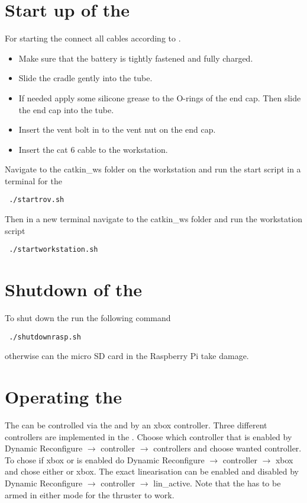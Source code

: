 \section{Start up of the \abbrROV}
For starting the \abbrROV connect all cables according to .
\begin{itemize}
	\item Make sure that the battery is tightly fastened and fully charged. 
	\item Slide the cradle gently into the \abbrROV tube. 
	\item If needed apply some silicone grease to the O-rings of the end cap. Then slide the end cap into the \abbrROV tube.
	\item Insert the vent bolt in to the vent nut on the end cap.
	\item Insert the cat 6 cable to the workstation.
 \end{itemize} 
Navigate to the catkin\_ws folder on the workstation and run the start script in a terminal for the \abbrROV
\begin{lstlisting}
 ./startrov.sh
\end{lstlisting}
Then in a new terminal navigate to the catkin\_ws folder and run the workstation script
\begin{lstlisting}
 ./startworkstation.sh
\end{lstlisting} 

\section{Shutdown of the \abbrROV}
To shut down the \abbrROV run the following command
\begin{lstlisting}
 ./shutdownrasp.sh
\end{lstlisting}
otherwise can the micro SD card in the Raspberry Pi take damage.
\section{Operating the \abbrROV}
The \abbrROV can be controlled via the \abbrGUI and by an xbox controller. Three different controllers are implemented in the \abbrROV.
Choose which controller that is enabled by Dynamic Reconfigure $\rightarrow$ controller $\rightarrow$ controllers and choose wanted controller. To chose if xbox or \abbrGUI is enabled do  Dynamic Reconfigure $\rightarrow$ controller $\rightarrow$ xbox and chose either \abbrGUI or xbox. The exact linearisation can be enabled and disabled by Dynamic Reconfigure $\rightarrow$ controller $\rightarrow$ lin\_active. Note that the \abbrROV has to be armed in either mode for the thruster to work.

